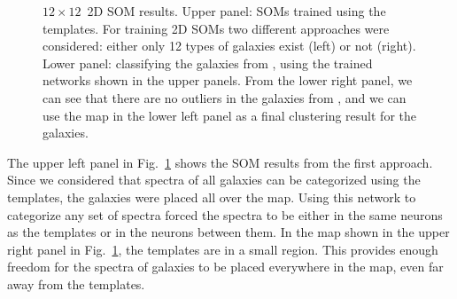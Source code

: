 \begin{figure}
\begin{subfigure}[b]{0.45\textwidth}
            \end{subfigure}
            \caption[$12\times12$ two-dimensional self-organizing map results]{$12\times12$~2D SOM results. Upper panel: SOMs trained using the \citet{Kinney96} templates. For training 2D SOMs two different approaches were considered: either only 12 types of galaxies exist (left) or not (right). Lower panel: classifying the galaxies from \citet{Hossein12}, using the trained networks shown in the upper panels. From the lower right panel, we can see that there are no outliers in the galaxies from , and we can use the map in the lower left panel as a final clustering result for the  galaxies.}
            \label{fig: 12by12}
        \end{figure}
    
        The upper left panel in Fig.~\ref{fig: 12by12} shows the SOM results from the first approach. 
        Since we considered that spectra of all galaxies can be categorized using the  templates, the galaxies were placed all over the map.
        Using this network to categorize any set of spectra forced the spectra to be either in the same neurons as the  templates or in the neurons between them.
        In the map shown in the upper right panel in Fig.~\ref{fig: 12by12}, the  templates are in a small region. This provides enough freedom for the spectra of galaxies to be placed everywhere in the map, even far away from the templates.
    
